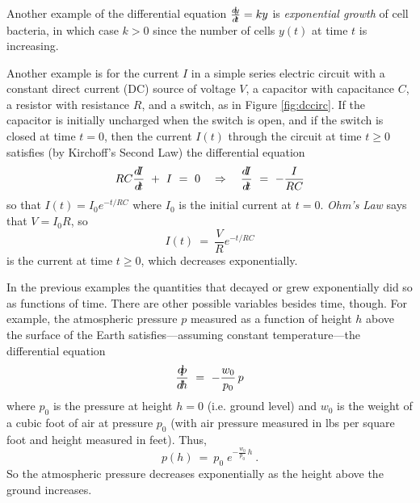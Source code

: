\begin{exmp}
Another example of the differential equation $\frac{d\negmedspace y}{d\!t} = ky$ is \emph{exponential
growth} of cell bacteria, in which case $k > 0$ since
the number of cells $y(t)$ at time $t$ is increasing.
\end{exmp}
\begin{exmp}
\piccaption[]{\label{fig:dccirc}}
\noindent Another example is for the current $I$ in a simple series electric
circuit with a constant direct current (DC) source of voltage $V$, a capacitor
with capacitance $C$, a resistor with resistance $R$, and a switch, as in
Figure \ref{fig:dccirc}. If the capacitor is initially uncharged when the switch
is open, and if the switch is closed at time $t = 0$, then the current $I(t)$
through the circuit at time $t \ge 0$  satisfies (by Kirchoff's Second Law) the
differential equation
\begin{displaymath}
 RC\frac{d\negmedspace I}{d\!t} ~+~ I ~=~ 0 \quad\Rightarrow\quad
 \frac{d\negmedspace I}{d\!t} ~=~ -\frac{I}{RC}
\end{displaymath}
so that $I(t) = I_0 e^{-t/RC}$ where $I_0$ is the initial current at $t = 0$.
\emph{Ohm's Law} says that $V = I_0R$, so
\begin{displaymath}
I(t) ~=~ \frac{V}{R} e^{-t/RC}
\end{displaymath}
is the current at time $t \ge 0$, which decreases exponentially.
\end{exmp}
\begin{exmp}
In the previous examples the quantities that decayed or grew exponentially
did so as functions of time. There are other possible variables besides time,
though. For example, the atmospheric pressure $p$ measured as a function of
height $h$ above the surface of the Earth satisfies---assuming constant
temperature---the differential equation
\begin{displaymath}
 \frac{d\negmedspace p}{d\!h} ~=~ -\frac{w_0}{p_0}\,p
\end{displaymath}
where $p_0$ is the pressure at height $h = 0$ (i.e. ground level) and $w_0$ is
the weight of a cubic foot of air at pressure $p_0$ (with air pressure measured
in lbs per square foot and height measured in feet). Thus,
\begin{displaymath}
 p(h) ~=~ p_0\;e^{-\frac{w_0}{p_0}\,h} ~.
\end{displaymath}
So the atmospheric pressure decreases exponentially as the height above the
ground increases.
\end{exmp}
